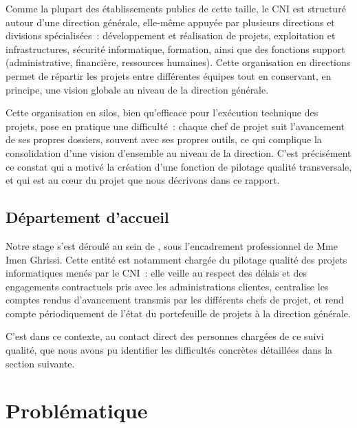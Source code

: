 Comme la plupart des établissements publics de cette taille, le CNI est structuré autour d'une direction générale, elle-même appuyée par plusieurs directions et divisions spécialisées~: développement et réalisation de projets, exploitation et infrastructures, sécurité informatique, formation, ainsi que des fonctions support (administrative, financière, ressources humaines). Cette organisation en directions permet de répartir les projets entre différentes équipes tout en conservant, en principe, une vision globale au niveau de la direction générale.


Cette organisation en silos, bien qu'efficace pour l'exécution technique des projets, pose en pratique une difficulté~: chaque chef de projet suit l'avancement de ses propres dossiers, souvent avec ses propres outils, ce qui complique la consolidation d'une vision d'ensemble au niveau de la direction. C'est précisément ce constat qui a motivé la création d'une fonction de pilotage qualité transversale, et qui est au cœur du projet que nous décrivons dans ce rapport.

\subsection{Département d'accueil}
\label{subsec:departement-accueil}

Notre stage s'est déroulé au sein de , sous l'encadrement professionnel de Mme Imen Ghrissi. Cette entité est notamment chargée du pilotage qualité des projets informatiques menés par le CNI~: elle veille au respect des délais et des engagements contractuels pris avec les administrations clientes, centralise les comptes rendus d'avancement transmis par les différents chefs de projet, et rend compte périodiquement de l'état du portefeuille de projets à la direction générale.

C'est dans ce contexte, au contact direct des personnes chargées de ce suivi qualité, que nous avons pu identifier les difficultés concrètes détaillées dans la section suivante.

\section{Problématique}
\label{sec:problematique}

